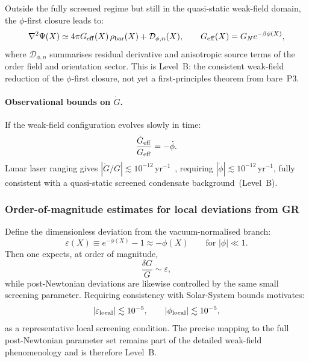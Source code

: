 \documentclass[11pt,a4paper]{article}
\numberwithin{equation}{section}
\begin{document}
Outside the fully screened regime but still in the quasi-static
weak-field domain, the $\phi$-first closure leads to:
\begin{equation}
  \label{eq:mod_Poisson}
  \nabla^2\Psi(X)
  \simeq
  4\pi G_{\rm eff}(X)\,\rho_{\rm bar}(X)
  + \mathcal{D}_{\phi,n}(X),
  \qquad
  G_{\rm eff}(X) = G_N e^{-\beta\phi(X)},
\end{equation}
where $\mathcal{D}_{\phi,n}$ summarises residual derivative and
anisotropic source terms of the order field and orientation sector.
This is Level~B: the consistent weak-field reduction of the $\phi$-first
closure, not yet a first-principles theorem from bare~P3.

\paragraph{Observational bounds on $\dot G$.}
If the weak-field configuration evolves slowly in time:
\begin{equation}
  \label{eq:Gdot_over_G}
  \frac{\dot G_{\rm eff}}{G_{\rm eff}} = -\dot\phi.
\end{equation}
Lunar laser ranging gives $|\dot G/G|\lesssim 10^{-12}$\,yr$^{-1}$~\cite{Uzan2011},
requiring $|\dot\phi|\lesssim 10^{-12}$\,yr$^{-1}$, fully consistent
with a quasi-static screened condensate background~(Level~B).

\subsubsection*{Order-of-magnitude estimates for local deviations from GR}

Define the dimensionless deviation from the vacuum-normalised branch:
\begin{equation}
  \label{eq:epsilon_dev}
  \varepsilon(X)\equiv e^{-\phi(X)}-1\approx -\phi(X)
  \qquad\text{for }|\phi|\ll 1.
\end{equation}
Then one expects, at order of magnitude,
\[
\frac{\delta G}{G}\sim\varepsilon,
\]
while post-Newtonian deviations are likewise controlled by the same
small screening parameter.
Requiring consistency with Solar-System bounds motivates:
\begin{equation}
  \label{eq:epsilon_local_bound}
  |\varepsilon_{\rm local}|\lesssim 10^{-5},
  \qquad
  |\phi_{\rm local}|\lesssim 10^{-5},
\end{equation}
as a representative local screening condition.
The precise mapping to the full post-Newtonian parameter set remains
part of the detailed weak-field phenomenology and is therefore Level~B.
\end{document}
